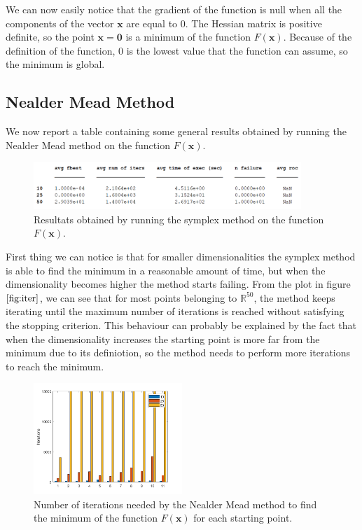 We can now easily notice that the gradient of the function is null when all the components of the vector $\mathbf{x}$ are equal to 0. The Hessian matrix is positive definite, so the point $\mathbf{x} = \mathbf{0}$ is a minimum of the function $F(\mathbf{x})$. 
Because of the definition of the function, $0$ is the lowest value that the function can assume, so the minimum is global.


\subsection*{Nealder Mead Method}
We now report a table containing some general results obtained by running the Nealder Mead method on the function $F(\mathbf{x})$.

\begin{figure}[htbp]
    \centering
    \includegraphics[width = 0.9\textwidth]{img/pb76_table_SX.png}
    \caption{Resultats obtained by running the symplex method on the function $F(\mathbf{x})$.}
\end{figure}

First thing we can notice is that for smaller dimensionalities the symplex method is able to find the minimum in a reasonable amount of time, but when the dimensionality becomes higher the method starts failing.
From the plot in figure $\eqref{fig:iter}$, we can see that for most points belonging to $\mathbb{R}^{50}$, the method keeps iterating until the maximum number of iterations is reached without satisfying the stopping criterion.
This behaviour can probably be explained by the fact that when the dimensionality increases the starting point is more far from the minimum due to its definiotion, so the method needs to perform more iterations to reach the minimum.
\begin{figure}[htbp]
    \centering
    \includegraphics[width = 0.5\textwidth]{img/pb76_SX_iter.png}
    \caption{Number of iterations needed by the Nealder Mead method to find the minimum of the function $F(\mathbf{x})$ for each starting point.}
    \label{fig:iter}
\end{figure}


